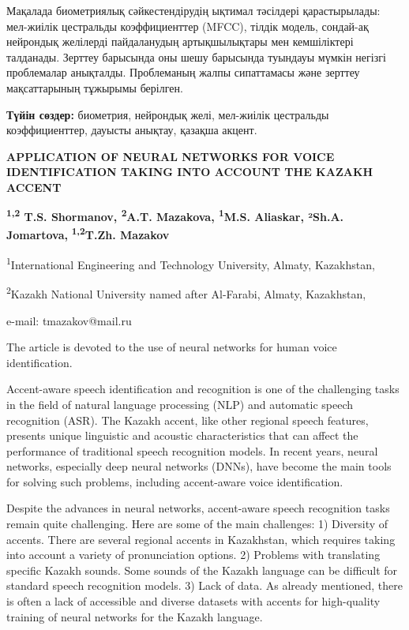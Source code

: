 Мақалада биометриялық сәйкестендірудің ықтимал тәсілдері қарастырылады:
мел-жиілік цестральды коэффициенттер (MFCC), тілдік модель, сондай-ақ
нейрондық желілерді пайдаланудың артықшылықтары мен кемшіліктері
талданады. Зерттеу барысында оны шешу барысында туындауы мүмкін негізгі
проблемалар анықталды. Проблеманың жалпы сипаттамасы және зерттеу
мақсаттарының тұжырымы берілген.

{\bfseries Түйін сөздер:} биометрия, нейрондық желі, мел-жиілік цестральды
коэффициенттер, дауысты анықтау, қазақша акцент.

\begin{articleheader}
{\bfseries APPLICATION OF NEURAL NETWORKS FOR VOICE IDENTIFICATION TAKING
INTO ACCOUNT THE KAZAKH ACCENT}

{\bfseries \textsuperscript{1,2} T.S. Shormanov, \textsuperscript{2}A.T.
Mazakova, \textsuperscript{1}M.S. Aliaskar, ²Sh.A. Jomartova,}
{\bfseries \textsuperscript{1,2}T.Zh. Mazakov\textsuperscript{\envelope }}
\end{articleheader}

\begin{affiliation}
\textsuperscript{1}International Engineering and Technology University,
Almaty, Kazakhstan,

\textsuperscript{2}Kazakh National University named after Al-Farabi,
Almaty, Kazakhstan,

e-mail: tmazakov@mail.ru

\end{affiliation}

The article is devoted to the use of neural networks for human voice
identification.

Accent-aware speech identification and recognition is one of the
challenging tasks in the field of natural language processing (NLP) and
automatic speech recognition (ASR). The Kazakh accent, like other
regional speech features, presents unique linguistic and acoustic
characteristics that can affect the performance of traditional speech
recognition models. In recent years, neural networks, especially deep
neural networks (DNNs), have become the main tools for solving such
problems, including accent-aware voice identification.

Despite the advances in neural networks, accent-aware speech recognition
tasks remain quite challenging. Here are some of the main challenges: 1)
Diversity of accents. There are several regional accents in Kazakhstan,
which requires taking into account a variety of pronunciation options.
2) Problems with translating specific Kazakh sounds. Some sounds of the
Kazakh language can be difficult for standard speech recognition models.
3) Lack of data. As already mentioned, there is often a lack of
accessible and diverse datasets with accents for high-quality training
of neural networks for the Kazakh language.


